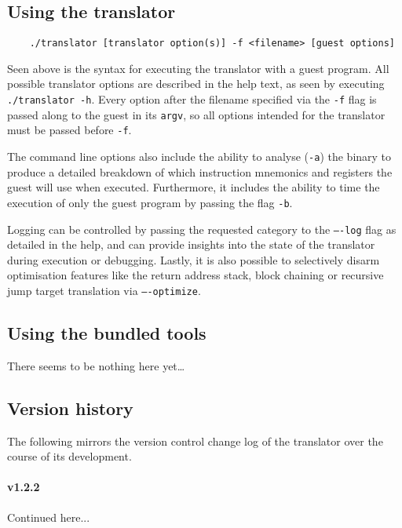 \subsection{Using the translator}
\label{sec:translator-usage}
\begin{lstlisting}
	./translator [translator option(s)] -f <filename> [guest options]
\end{lstlisting}

Seen above is the syntax for executing the translator with a guest program.
All possible translator options are described in the help text, as seen by executing \texttt{./translator -h}.
Every option after the filename specified via the \texttt{-f} flag is passed along to the guest in its \texttt{argv}, so all options intended for the translator must be passed before \texttt{-f}.

The command line options also include the ability to analyse (\texttt{-a}) the binary to produce a detailed breakdown of which instruction mnemonics and registers the guest will use when executed.
Furthermore, it includes the ability to time the execution of only the guest program by passing the flag \texttt{-b}.

Logging can be controlled by passing the requested category to the \texttt{----log} flag as detailed in the help, and can provide insights into the state of the translator during execution or debugging.
Lastly, it is also possible to selectively disarm optimisation features like the return address stack, block chaining or recursive jump target translation via \texttt{----optimize}.


\subsection{Using the bundled tools}
There seems to be nothing here yet\ldots


\subsection{Version history}
The following mirrors the version control change log of the translator over the course of its development.

\paragraph{v1.2.2}
Continued here...





